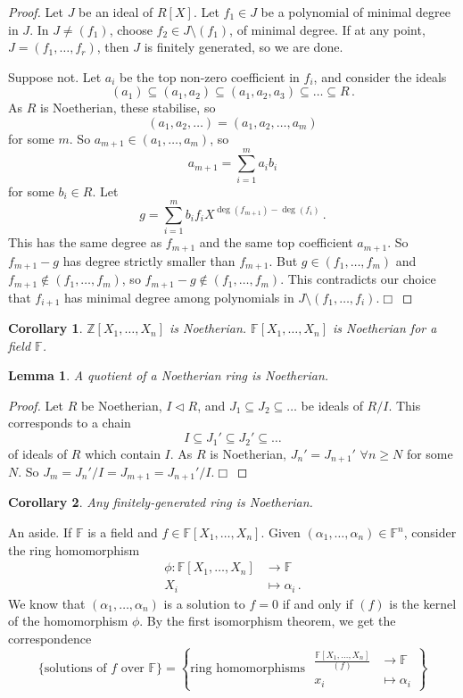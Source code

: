 \documentclass{article}
\theoremstyle{plain}\theoremheaderfont{\normalfont\itshape}\theorembodyfont{\rmfamily}\theoremseparator{.}\newtheorem*{rem}{Remark}\newtheorem*{ex}{Example}\newtheorem*{proof}{Proof}\newtheorem*{altp}{Alternative proof}\newtheorem*{nonex}{Non-Example}
\theoremstyle{plain}\theoremheaderfont{\normalfont\bfseries}\theorembodyfont{\rmfamily}\theoremseparator{.}\newtheorem{thm}{Theorem}[section]\newtheorem{lem}[thm]{Lemma}\newtheorem{prop}[thm]{Proposition}\newtheorem*{cor}{Corollary}\newtheorem{defn}[thm]{Definition}\newtheorem{clm}[thm]{Claim}\newtheorem{clminproof}{Claim}\newtheorem*{notn}{Notation}\newtheorem*{exer}{Exercise}\newtheorem*{lemnn}{Lemma}
\theoremstyle{break}\theoremheaderfont{\normalfont\itshape}\theorembodyfont{\rmfamily}\theoremseparator{.\medskip}\newtheorem*{proofskip}{Proof}\newtheorem*{exs}{Examples}\newtheorem*{rems}{Remarks}\newtheorem*{obs}{Observations}
\theoremstyle{break}\theoremheaderfont{\normalfont\bfseries}\theorembodyfont{\rmfamily}\theoremseparator{.\medskip}\newtheorem{lemskip}[thm]{Lemma}\newtheorem{defnskip}[thm]{Definition}\newtheorem{propskip}[thm]{Proposition}\newtheorem{thmskip}[thm]{Theorem}
\numberwithin{equation}{section}
\newcommand{\qed}{\hfill\ensuremath{\Box}}
\newcommand{\ZZ}{\mathbb{Z}}
\newcommand{\FF}{\mathbb{F}}
\begin{document}
    \begin{proof}
        Let \(J\) be an ideal of \(R[X]\). Let \(f_1\in J\) be a polynomial of minimal degree in \(J\). In \(J\ne(f_1)\), choose \(f_2\in J\setminus (f_1)\), of minimal degree. If at any point, \(J=(f_1,\dots,f_r)\), then \(J\) is finitely generated, so we are done.

        Suppose not. Let \(a_i\) be the top non-zero coefficient in \(f_i\), and consider the ideals
        \[(a_1)\subseteq(a_1,a_2)\subseteq(a_1,a_2,a_3)\subseteq\dots\subseteq R\,.\]
        As \(R\) is Noetherian, these stabilise, so
        \[(a_1,a_2,\dots)=(a_1,a_2,\dots,a_m)\]
        for some \(m\). So \(a_{m+1}\in(a_1,\dots,a_m)\), so
        \[a_{m+1}=\sum_{i=1}^{m}a_ib_i\]
        for some \(b_i\in R\). Let
        \[g=\sum_{i=1}^{m}b_if_iX^{\deg(f_{m+1})-\deg(f_i)}\,.\]
        This has the same degree as \(f_{m+1}\) and the same top coefficient \(a_{m+1}\). So \(f_{m+1}-g\) has degree strictly smaller than \(f_{m+1}\). But \(g\in (f_1,\dots,f_m)\) and \(f_{m+1}\notin (f_1,\dots,f_m)\), so \(f_{m+1}-g\notin (f_1,\dots,f_m)\). This contradicts our choice that \(f_{i+1}\) has minimal degree among polynomials in \(J\setminus(f_1,\dots,f_i)\).\qed
    \end{proof}
    \begin{cor}
        \(\ZZ[X_1,\dots,X_n]\) is Noetherian. \(\FF[X_1,\dots,X_n]\) is Noetherian for a field \(\FF\).
    \end{cor}
    \begin{lem}
        A quotient of a Noetherian ring is Noetherian.
    \end{lem}
    \begin{proof}
        Let \(R\) be Noetherian, \(I\lhd R\), and \(J_1\subseteq J_2\subseteq\dots\) be ideals of \(R/I\). This corresponds to a chain
        \[I\subseteq J_1'\subseteq J_2'\subseteq\dots\]
        of ideals of \(R\) which contain \(I\). As \(R\) is Noetherian, \(J_n'=J_{n+1}'\) \(\forall n\ge N\) for some \(N\). So \(J_{m}=J_n'/I=J_{m+1}=J_{n+1}'/I\).\qed
    \end{proof}
    \begin{cor}
        Any finitely-generated ring is Noetherian.
    \end{cor}

    An aside. If \(\FF\) is a field and \(f\in\FF[X_1,\dots,X_n]\). Given \((\alpha_1,\dots,\alpha_n)\in\FF^n\), consider the ring homomorphism
    \begin{align*}
        \phi:\FF[X_1,\dots,X_n]&\longrightarrow \FF\\
        X_i&\longmapsto \alpha_i\,.
    \end{align*}
    We know that \((\alpha_1,\dots,\alpha_n)\) is a solution to \(f=0\) if and only if \((f)\) is the kernel of the homomorphism \(\phi\). By the first isomorphism theorem, we get the correspondence
    \[\{\text{solutions of \(f\) over \(\FF\)}\}=\left\{\text{ring homomorphisms }\begin{aligned}
        \frac{\FF[X_1,\dots,X_n]}{(f)}&\longrightarrow\FF\\
        x_i&\longmapsto \alpha_i
    \end{aligned}\right\}\]
\end{document}
